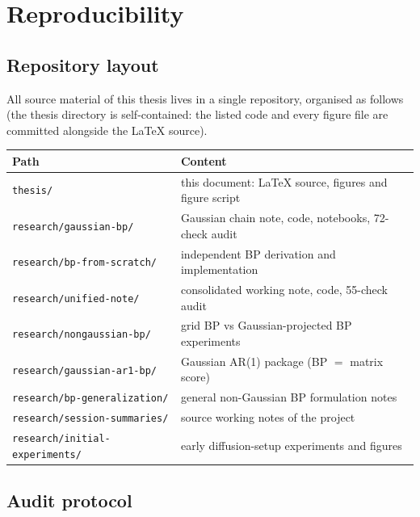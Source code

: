\chapter{Reproducibility}\label{app:repro}

\section{Repository layout}

All source material of this thesis lives in a single repository, organised
as follows (the thesis directory is self-contained: the listed code and
every figure file are committed alongside the \LaTeX{} source).

\begin{center}\small
\begin{tabular}{@{}ll@{}}
\toprule
Path & Content \\
\midrule
\texttt{thesis/} & this document: \LaTeX{} source, figures and figure script \\
\texttt{research/gaussian-bp/} & Gaussian chain note, code, notebooks, 72-check audit \\
\texttt{research/bp-from-scratch/} & independent BP derivation and implementation \\
\texttt{research/unified-note/} & consolidated working note, code, 55-check audit \\
\texttt{research/nongaussian-bp/} & grid BP vs Gaussian-projected BP experiments \\
\texttt{research/gaussian-ar1-bp/} & Gaussian AR(1) package (BP $=$ matrix score) \\
\texttt{research/bp-generalization/} & general non-Gaussian BP formulation notes \\
\texttt{research/session-summaries/} & source working notes of the project \\
\texttt{research/initial-experiments/} & early diffusion-setup experiments and figures \\
\bottomrule
\end{tabular}
\end{center}

\section{Audit protocol}

